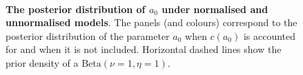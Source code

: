 \documentclass[a4paper, notitlepage, 11pt]{article}
\begin{document}
\begin{figure}
\hfill
{}
\hfill
{}\\
\hfill
{}
\hfill
{}
\hfill
\caption{\textbf{The posterior distribution of $a_0$ under normalised and unnormalised models}.
The panels (and colours) correspond to the posterior distribution of the parameter $a_0$ when $c(a_0)$ is accounted for and when it is not included.
Horizontal dashed lines show the prior density of a $\text{Beta}(\nu = 1, \eta = 1)$.
}
\label{fig:normalisation}
\end{figure}
\end{document}
